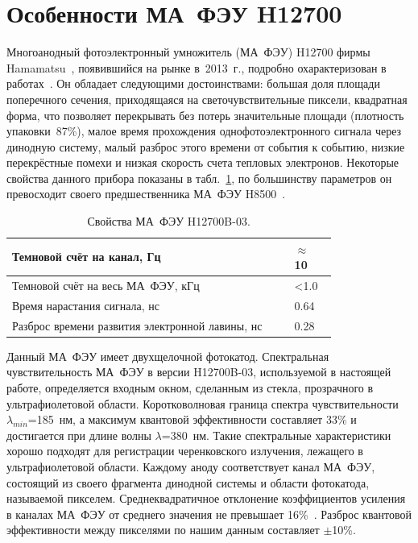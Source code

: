 \section{Особенности МА~ФЭУ H12700}\label{sec:secMapmt}

Многоанодный фотоэлектронный умножитель (МА~ФЭУ) H12700 фирмы Hamamatsu~\cite{H12700MANUAL}, появившийся на рынке в~2013~г., подробно охарактеризован в работах~\cite{CALVI, CALVI2}. Он обладает следующими достоинствами: большая доля площади поперечного сечения, приходящаяся на светочувствительные пиксели, квадратная форма, что позволяет перекрывать без потерь значительные площади (плотность упаковки~87\%), малое время прохождения однофотоэлектронного сигнала через динодную систему, малый разброс этого времени от события к событию, низкие перекрёстные помехи и низкая скорость счета тепловых электронов. Некоторые свойства данного прибора показаны в табл.~\ref{tabl:MAPMT}, по большинству параметров он превосходит своего предшественника МА~ФЭУ H8500~\cite{H8500MANUAL}.

\begin{table}[H]
\caption{Свойства МА~ФЭУ H12700B-03.}
\label{tabl:MAPMT}


\begin{tabular}{ | p{0.7\linewidth} | p{0.1\linewidth} |}
	\hline
	Темновой счёт на канал, Гц & $ \approx $ 10 \\
	\hline
	Темновой счёт на весь МА~ФЭУ, кГц & <1.0 \\
	\hline
	Время нарастания сигнала, нс & 0.64 \\
	\hline
	Разброс времени развития электронной лавины, нс & 0.28 \\
	\hline
\end{tabular}

\end{table}

Данный МА~ФЭУ имеет двухщелочной фотокатод. Спектральная чувствительность МА~ФЭУ в версии H12700B-03, используемой в настоящей работе, определяется входным окном, сделанным из стекла, прозрачного в ультрафиолетовой области. Коротковолновая граница спектра чувствительности $ \lambda_{min} $=185~нм, а максимум квантовой эффективности составляет 33\% и достигается при длине волны $ \lambda $=380~нм. Такие спектральные характеристики хорошо подходят для регистрации черенковского излучения, лежащего в ультрафиолетовой области. Каждому аноду соответствует канал МА~ФЭУ, состоящий из своего фрагмента динодной системы и области фотокатода, называемой пикселем. Среднеквадратичное отклонение коэффициентов усиления в каналах МА~ФЭУ от среднего значения не превышает 16\%~\cite{H12700MANUAL}. Разброс квантовой эффективности между пикселями по нашим данным составляет $ \pm $10\%.


